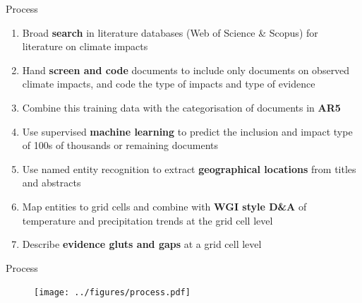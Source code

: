 \documentclass[9pt]{beamer}
\begin{document}
\begin{frame}{Process}

\begin{enumerate}
	\item Broad \textbf{search} in literature databases (Web of Science \& Scopus) for literature on climate impacts
	\item Hand \textbf{screen and code} documents to include only documents on observed climate impacts, and code the type of impacts and type of evidence
	\item Combine this training data with the categorisation of documents in \textbf{AR5}
	\item Use supervised \textbf{machine learning} to predict the inclusion and impact type of 100s of thousands or remaining documents
	\item Use named entity recognition to extract \textbf{geographical locations} from titles and abstracts
	\item Map entities to grid cells and combine with \textbf{WGI style D\&A} of temperature and precipitation trends at the grid cell level
	\item Describe \textbf{evidence gluts and gaps} at a grid cell level
	
\end{enumerate}

\end{frame}

\begin{frame}{Process}
\begin{figure}
\texttt{[image: ../figures/process.pdf]}
\end{figure}
\end{frame}


%
%	
%
%
%
\end{document}
